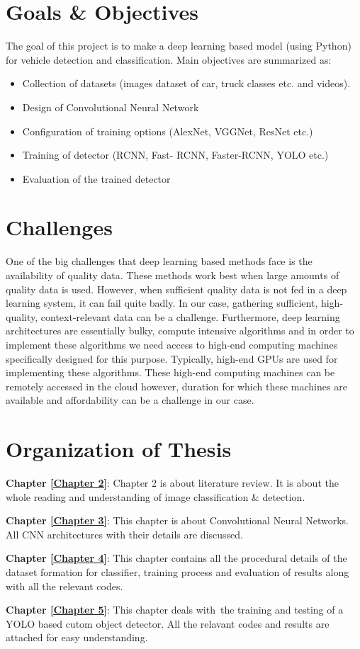\section{Goals \& Objectives}

The goal of this project is to make a deep learning based model (using Python) for vehicle detection and classification. Main objectives are summarized as:
\begin{itemize}
\item Collection of datasets (images dataset of car, truck classes etc. and videos).
\item Design of Convolutional Neural Network
\item Configuration of training options (AlexNet, VGGNet, ResNet etc.)
\item Training of detector (RCNN, Fast- RCNN, Faster-RCNN, YOLO etc.)
\item Evaluation of the trained detector
\end{itemize}

\section{Challenges}

One of the big challenges that deep learning based methods
face is the availability of quality data. These methods work
best when large amounts of quality data is used. However,
when sufficient quality data is not fed in a deep learning system,
it can fail quite badly. In our case, gathering sufficient, high-quality,
context-relevant data can be a challenge.
Furthermore, deep learning architectures are essentially bulky,
compute intensive algorithms and in order to implement these algorithms
we need access to high-end computing machines specifically designed
for this purpose. Typically, high-end GPUs are used for implementing
these algorithms. These high-end computing machines can be
remotely accessed in the cloud however, duration for which these
machines are available and affordability can be a challenge in our case.	

\section{Organization of Thesis}

\textbf{Chapter \ref{Chapter 2}}: Chapter 2 is about literature review. It is about
the whole reading and understanding of image classification \& detection.

\noindent\textbf{Chapter \ref{Chapter 3}}: This chapter is about Convolutional Neural Networks. All CNN architectures with their details
are discussed.

\noindent\textbf{Chapter \ref{Chapter 4}}: This chapter contains all
the procedural details of the dataset formation for classifier,
training process and evaluation of results along with all the relevant codes.

\noindent\textbf{Chapter \ref{Chapter 5}}: This chapter deals with\
the training and testing of a YOLO based cutom object detector.
All the relavant codes and results are attached for easy understanding.
